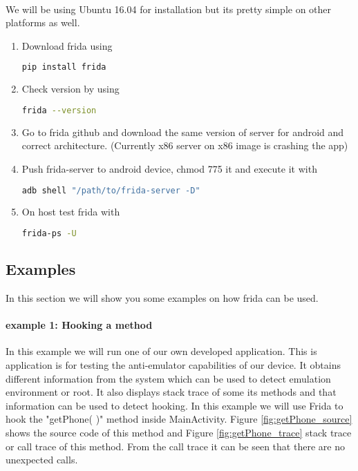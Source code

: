 \documentclass[../main.tex]{subfile}
\begin{document}
	\paragraph{} We will be using Ubuntu 16.04 for installation but its pretty simple on other platforms as well.
	\begin{enumerate}
		\item Download frida using
			\begin{lstlisting}[language=bash]
				pip install frida
			\end{lstlisting}
		
		\item Check version by using
			\begin{lstlisting}[language=bash]
				frida --version
			\end{lstlisting}
		\item Go to frida github and download the same version of server for android and correct architecture. (Currently x86 server on x86 image
		is crashing the app)
		\item Push frida-server to android device, chmod 775 it and execute it with
			\begin{lstlisting}[language=bash]
				adb shell "/path/to/frida-server -D"
			\end{lstlisting}
		\item On host test frida with
			\begin{lstlisting}[language=bash]
				frida-ps -U
			\end{lstlisting}
	\end{enumerate}

	\subsection{Examples}
	In this section we will show you some examples on how frida can be used.

	\paragraph{example 1: Hooking a method} \label{sec::hooking} In this example we will run one of our own developed application. This is application is for testing the anti-emulator capabilities of our device. It obtains different information from the system which can be used to detect emulation environment or root. It also displays stack trace of some its methods and that information can be used to detect hooking. In this example we will use Frida to hook the "getPhone( )" method inside MainActivity. Figure \ref{fig:getPhone_source} shows the source code of this method and Figure \ref{fig:getPhone_trace} stack trace or call trace of this method. From the call trace it can be seen that there are no unexpected calls.
	
\end{document}
